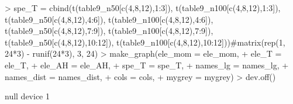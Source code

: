 \documentclass{article}
\begin{document}
\begin{Schunk}
\begin{Sinput}
> spe_T = cbind(t(table9_n50[c(4,8,12),1:3]), t(table9_n100[c(4,8,12),1:3]), t(table9_n50[c(4,8,12),4:6]), t(table9_n100[c(4,8,12),4:6]), t(table9_n50[c(4,8,12),7:9]), t(table9_n100[c(4,8,12),7:9]), t(table9_n50[c(4,8,12),10:12]), t(table9_n100[c(4,8,12),10:12]))#matrix(rep(1, 24*3) - runif(24*3), 3, 24)
> make_graph(ele_mom = ele_mom,
+            ele_T = ele_T,
+            ele_AH = ele_AH,
+            spe_T = spe_T,
+            names_lg = names_lg,
+            names_dist = names_dist,
+            cols = cols,
+            mygrey = mygrey)
> dev.off()
\end{Sinput}
\begin{Soutput}
null device 
          1 
\end{Soutput}
\end{Schunk}

\begin{figure}

\end{figure}
\end{document}
